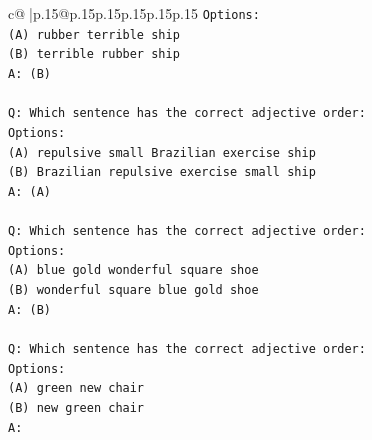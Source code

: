 \documentclass{article}
\begin{document}
{\begin{supertabular}{c@{$\;$}|p{.15\linewidth}@{}p{.15\linewidth}p{.15\linewidth}p{.15\linewidth}p{.15\linewidth}p{.15\linewidth}}
{{{\texttt{Options:} \\
\texttt{(A) rubber terrible ship} \\
\texttt{(B) terrible rubber ship} \\
\texttt{A: (B)} \\
\\ 
\texttt{Q: Which sentence has the correct adjective order:} \\
\texttt{Options:} \\
\texttt{(A) repulsive small Brazilian exercise ship} \\
\texttt{(B) Brazilian repulsive exercise small ship} \\
\texttt{A: (A)} \\
\\ 
\texttt{Q: Which sentence has the correct adjective order:} \\
\texttt{Options:} \\
\texttt{(A) blue gold wonderful square shoe} \\
\texttt{(B) wonderful square blue gold shoe} \\
\texttt{A: (B)} \\
\\ 
\texttt{Q: Which sentence has the correct adjective order:} \\
\texttt{Options:} \\
\texttt{(A) green new chair} \\
\texttt{(B) new green chair} \\
\texttt{A:} \\
            }
        }
    }
     \\ \\


\end{supertabular}}
\end{document}
